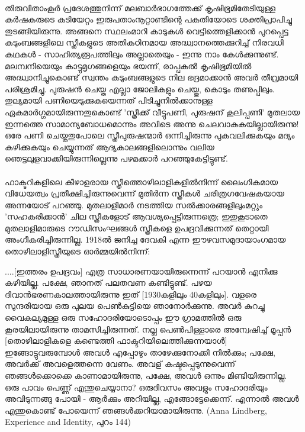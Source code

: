 \paragraph{}തിരുവിതാംകൂർ പ്രദേശത്തുനിന്ന് മലബാർഭാഗത്തേക്ക് കൃഷിഭൂമിതേടിയുള്ള കർഷകരുടെ കുടിയേറ്റം ഇരുപതാംനൂറ്റാണ്ടിന്റെ പകുതിയോടെ ശക്തിപ്രാപിച്ചു തുടങ്ങിയിരുന്നു. അങ്ങനെ സ്ഥലംമാറി കാടുകൾ വെട്ടിത്തെളിക്കാൻ പുറപ്പെട്ട കുടുംബങ്ങളിലെ സ്ത്രീകളുടെ അതികഠിനമായ അദ്ധ്വാനത്തെക്കുറിച്ച് നിരവധി കഥകൾ - സാഹിത്യരൂപത്തിലും അല്ലാതെയും - ഇന്നു നാം കേൾക്കുന്നുണ്ട്. മലമ്പനിയെയും കാട്ടുമൃഗങ്ങളെയും ഭയന്ന്, രാപ്പകൽ കൃഷിഭൂമിയിൽ അദ്ധ്വാനിച്ചുകൊണ്ട് സ്വന്തം കുടുംബങ്ങളുടെ നില ഭദ്രമാക്കാൻ അവർ തീവ്രമായി പരിശ്രമിച്ചു. പുരുഷൻ ചെയ്ത എല്ലാ ജോലികളും ചെയ്തു, കൊടും തണുപ്പിലും. തുല്യമായി പണിയെടുക്കുകയെന്നത് പിടിച്ചുനിൽക്കാനുള്ള ഏകമാർഗ്ഗമായിരുന്നതുകൊണ്ട് 'സ്ത്രീക്ക് വീട്ടുപണി, പുരുഷന് കൂലിപ്പണി' മുതലായ ഇന്നത്തെ സാമാന്യബോധമൊന്നും അവിടെ അന്നു ചെലവാകുകയില്ലായിരുന്നു! ഒരേ പണി ചെയ്തതുപോലെ സ്ത്രീപുരുഷന്മാർ ഒന്നിച്ചിരുന്നു പുകവലിക്കുകയും മദ്യം കഴിക്കുകയും ചെയ്യുന്നത് ആദ്യകാലങ്ങളിലൊന്നും വലിയ ഞെട്ടലുളവാക്കിയിരുന്നില്ലെന്നു പഴമക്കാർ പറഞ്ഞുകേട്ടിട്ടുണ്ട്.

\paragraph{}ഫാക്ടറികളിലെ കീഴാളരായ സ്ത്രീത്തൊഴിലാളികളിൽനിന്ന് ലൈംഗികമായ വിധേയത്വം പ്രതീക്ഷിച്ചിരുന്നുവെന്ന് മുതിർന്ന സ്ത്രീകൾ ചരിത്രഗവേഷകയായ അന്നയോട് പറഞ്ഞു. മുതലാളിമാർ നടത്തിയ സൽക്കാരങ്ങളിലുംമറ്റും 'സഹകരിക്കാൻ' ചില സ്ത്രീകളോട് ആവശ്യപ്പെട്ടിരുന്നത്രെ; ഇതുകൂടാതെ മുതലാളിമാരുടെ റൗഡിസംഘങ്ങൾ സ്ത്രീകളെ ഉപദ്രവിക്കുന്നത് തെറ്റായി അംഗീകരിച്ചിരുന്നില്ല. 1918ൽ ജനിച്ച ദേവകി എന്ന ഈഴവസമുദായാംഗമായ തൊഴിലാളിസ്ത്രീയുടെ ഓർമ്മയിൽനിന്ന്:
\begin{tcolorbox}{}
....[ഇത്തരം ഉപദ്രവം] എത്ര സാധാരണയായിരുന്നെന്ന് പറയാൻ എനിക്കു കഴിയില്ല. പക്ഷേ, ഞാനത് പലതവണ കണ്ടിട്ടുണ്ട്. പഴയ ദിവാൻഭരണകാലത്തായിരുന്നു ഇത് [1930കളിലും 40കളിലും]. വളരെ സുന്ദരിയായ ഒരു പുലയ പെൺകുട്ടിയെ ഞാനോർക്കുന്നു. അവർ കുറച്ചു വൈകല്യമുള്ള ഒരു സഹോദരിയോടൊപ്പം ഈ ഗ്രാമത്തിൽ ഒരു കൂരയിലായിരുന്നു താമസിച്ചിരുന്നത്. നല്ല പെൺപിള്ളാരെ അന്വേഷിച്ച് മൂപ്പൻ [തൊഴിലാളികളെ കണ്ടെത്തി ഫാക്ടറിയിലെത്തിക്കുന്നയാൾ] ഇങ്ങോട്ടുവരുമ്പോൾ അവൾ എപ്പോഴും താഴേക്കുനോക്കി നിൽക്കും; പക്ഷേ, അവർക്ക് അവളെത്തന്നെ വേണം. അവള് കഷ്ടപ്പെടുന്നുവെന്ന് ഞങ്ങൾക്കൊക്കെ കാണാമായിരുന്നു, പക്ഷേ, അവൾ ഒന്നും മിണ്ടിയിരുന്നില്ല. ഒരു പാവം പെണ്ണ് എന്തുചെയ്യാനാ? ഒരുദിവസം അവളും സഹോദരിയും അവിടുന്നങ്ങു പോയി - ആർക്കും അറിയില്ല, എങ്ങോട്ടേക്കെന്ന്. എന്നാൽ അവൾ എന്തുകൊണ്ട് പോയെന്ന് ഞങ്ങൾക്കറിയാമായിരുന്നു.
(Anna Lindberg, Experience and Identity, പുറം 144)
\end{tcolorbox}
